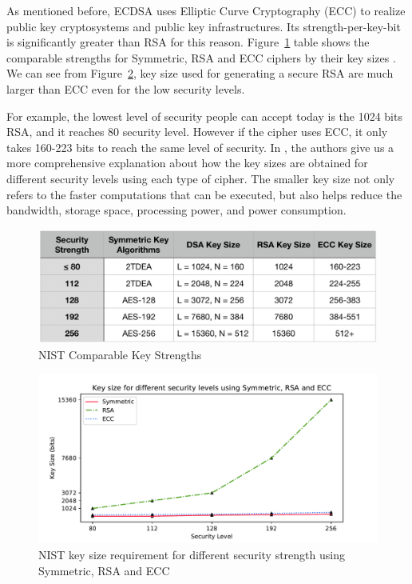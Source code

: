 \documentclass[10pt,sigconf]{acmart}
\begin{document}
As mentioned before, ECDSA uses Elliptic Curve Cryptography (ECC) to realize public key cryptosystems and public key infrastructures. Its strength-per-key-bit is significantly  greater than RSA for this reason. Figure~\ref{fig:NIST_Comparable_Strengths} table shows the comparable strengths for Symmetric, RSA and ECC ciphers by their key sizes \cite{nistKeysizes}. We can see from Figure~\ref{fig:NIST_KeySize_Compare_Security_Strength}, key size used for generating a secure RSA are much larger than ECC even for the low security levels. 

For example, the lowest level of security people can accept today is the 1024 bits RSA, and it reaches 80 security level. However if the cipher uses ECC, it only takes 160-223 bits to reach the same level of security. In \cite{lenstra:hal-00925622}, the authors give us a more  comprehensive explanation about how the key sizes are obtained for different security levels using each type of cipher. The smaller key size not only refers to the faster computations that can be executed, but also helps reduce the bandwidth, storage space, processing power, and power consumption.

\begin{figure}[H]
\centering
\includegraphics[scale=0.4]{NIST_Comparable_Strengths.png}
\caption{\small{NIST Comparable Key Strengths}}
\label{fig:NIST_Comparable_Strengths}
\end{figure}

\begin{figure}
\centering
\includegraphics[scale=0.45]{NIST_KeySize_Compare_Security_Strength}
\caption{\small{NIST key size requirement for different security strength using Symmetric, RSA and ECC}}
\label{fig:NIST_KeySize_Compare_Security_Strength}
\end{figure}
\end{document}

